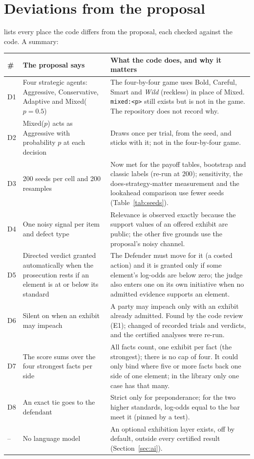 \section{Deviations from the proposal}\label{sec:deviations}
 lists every place the code differs from the proposal, each checked against the code. A summary:
\begin{center}\small
\begin{tabularx}{\textwidth}{@{}l p{4.2cm} X@{}}
\toprule
\textbf{\#} & \textbf{The proposal says} & \textbf{What the code does, and why it matters}\\
\midrule
D1 & Four strategic agents: Aggressive, Conservative, Adaptive and Mixed($p=0.5$) & The four-by-four game uses Bold, Careful, Smart and \emph{Wild} (reckless) in place of Mixed. \texttt{mixed:<p>} still exists but is not in the game. The repository does not record why.\\
D2 & Mixed($p$) acts as Aggressive with probability $p$ at each decision & Draws once per trial, from the seed, and sticks with it; not in the four-by-four game.\\
D3 & 200 seeds per cell and 200 resamples & Now met for the payoff tables, bootstrap and classic labels (re-run at 200); sensitivity, the does-strategy-matter measurement and the lookahead comparison use fewer seeds (Table~\ref{tab:seeds}).\\
D4 & One noisy signal per item and defect type & Relevance is observed exactly because the support values of an offered exhibit are public; the other five grounds use the proposal's noisy channel.\\
D5 & Directed verdict granted automatically when the prosecution rests if an element is at or below its standard & The Defender must move for it (a costed action) and it is granted only if some element's log-odds are below zero; the judge also enters one on its own initiative when no admitted evidence supports an element.\\
D6 & Silent on when an exhibit may impeach & A party may impeach only with an exhibit already admitted. Found by the code review (E1); changed \EOneDigests{} of \EOneTrials{} recorded trials and \EOneFlipped{} verdicts, and the certified analyses were re-run.\\
D7 & The score sums over the four strongest facts per side & All facts count, one exhibit per fact (the strongest); there is no cap of four. It could only bind where five or more facts back one side of one element; in the library only one case has that many.\\
D8 & An exact tie goes to the defendant & Strict only for preponderance; for the two higher standards, log-odds equal to the bar meet it (pinned by a test).\\
-- & No language model & An optional exhibition layer exists, off by default, outside every certified result (Section~\ref{sec:ai}).\\
\bottomrule
\end{tabularx}
\end{center}
